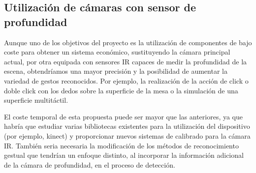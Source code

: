 \subsection{Utilización de cámaras con sensor de profundidad} 

Aunque uno de los objetivos del proyecto es la utilización de componentes de bajo coste para obtener un sistema económico, sustituyendo la cámara principal actual, por otra equipada con sensores IR capaces de medir la profundidad de la escena, obtendríamos una mayor precisión y la posibilidad de aumentar la variedad de gestos reconocidos. Por ejemplo, la realización de la acción de click o doble click con los dedos sobre la superficie de la mesa o la simulación de una superficie multitáctil.

El coste temporal de esta propuesta puede ser mayor que las anteriores, ya que habría que estudiar varias bibliotecas existentes para la utilización del dispositivo (por ejemplo, kinect) y proporcionar nuevos sistemas de calibrado para la cámara IR. También seria necesaria la modificación de los métodos de reconocimiento gestual que tendrían un enfoque distinto, al incorporar la información adicional de la cámara de profundidad, en el proceso de detección.  

